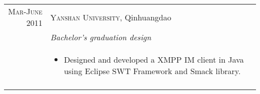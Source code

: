 \documentclass[a4paper,10pt]{article} %
\begin{document}
\begin{tabular}{r|p{11cm}}
\textsc{Mar-June 2011} & \textsc{Yanshan University}, Qinhuangdao \emph{}\smallskip\\
& \emph{Bachelor's graduation design}\\
& \footnotesize{
\begin{itemize}
\item Designed and developed a XMPP IM client in Java using Eclipse SWT Framework and Smack library.
\end{itemize}
 }\smallskip\\
\multicolumn{2}{c}{} \\

\end{tabular}






\end{document}
